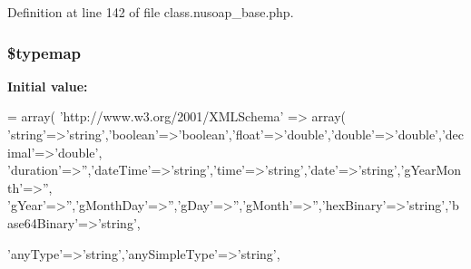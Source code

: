 Definition at line 142 of file class.\-nusoap\-\_\-base.\-php.

\hypertarget{classnusoap__base_abc776370d77b6fe463a62fa2faf26c2e}{
\subsubsection[{\$typemap}]{\setlength{\rightskip}{0pt plus 5cm}\$typemap}}\label{classnusoap__base_abc776370d77b6fe463a62fa2faf26c2e}
{\bfseries Initial value\-:}
\begin{DoxyCode}
= array(
    \textcolor{stringliteral}{'http://www.w3.org/2001/XMLSchema'} => array(
        \textcolor{stringliteral}{'string'}=>\textcolor{stringliteral}{'string'},\textcolor{stringliteral}{'boolean'}=>\textcolor{stringliteral}{'boolean'},\textcolor{stringliteral}{'float'}=>\textcolor{stringliteral}{'double'},\textcolor{stringliteral}{'double'}=>\textcolor{stringliteral}{'double'},\textcolor{stringliteral}{'decimal'}=>\textcolor{stringliteral}{'double'},
        \textcolor{stringliteral}{'duration'}=>\textcolor{stringliteral}{''},\textcolor{stringliteral}{'dateTime'}=>\textcolor{stringliteral}{'string'},\textcolor{stringliteral}{'time'}=>\textcolor{stringliteral}{'string'},\textcolor{stringliteral}{'date'}=>\textcolor{stringliteral}{'string'},\textcolor{stringliteral}{'gYearMonth'}=>\textcolor{stringliteral}{''},
        \textcolor{stringliteral}{'gYear'}=>\textcolor{stringliteral}{''},\textcolor{stringliteral}{'gMonthDay'}=>\textcolor{stringliteral}{''},\textcolor{stringliteral}{'gDay'}=>\textcolor{stringliteral}{''},\textcolor{stringliteral}{'gMonth'}=>\textcolor{stringliteral}{''},\textcolor{stringliteral}{'hexBinary'}=>\textcolor{stringliteral}{'string'},\textcolor{stringliteral}{'base64Binary'}=>\textcolor{stringliteral}{'string'},
        
        \textcolor{stringliteral}{'anyType'}=>\textcolor{stringliteral}{'string'},\textcolor{stringliteral}{'anySimpleType'}=>\textcolor{stringliteral}{'string'},
        

\end{DoxyCode}
